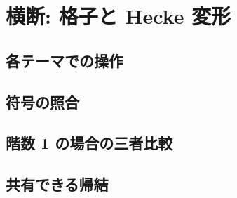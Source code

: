 
\section{横断: 格子と Hecke 変形}

\subsection{各テーマでの操作}

\subsection{符号の照合}

\subsection{階数 1 の場合の三者比較}

\subsection{共有できる帰結}
